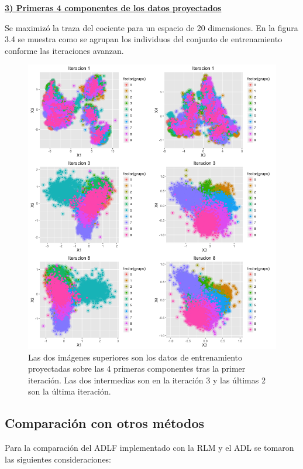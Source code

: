 \pagebreak
\underline{\textbf{3) Primeras 4 componentes de los datos proyectados}}

Se maximizó la traza del cociente para un espacio de 20 dimensiones. En la figura 3.4 se muestra como se agrupan los individuos del conjunto de entrenamiento conforme las iteraciones avanzan. 
  
\begin{figure}[!ht]
  \centering
	\includegraphics[width=1\textwidth]{Figures/Chapter4_ejemplo20componentes_StateFarm.png}	
  \caption[Ejemplo de proyección en 20 dimensiones (State Farm)]
  {Las dos imágenes superiores son los datos de entrenamiento proyectadas sobre las 4 primeras componentes tras la primer iteración. Las dos intermedias son en la iteración 3 y las últimas 2 son la última iteración.}
\end{figure}

\pagebreak

\subsection{Comparación con otros métodos}

Para la comparación del ADLF implementado con la RLM y el ADL se tomaron las siguientes consideraciones:

